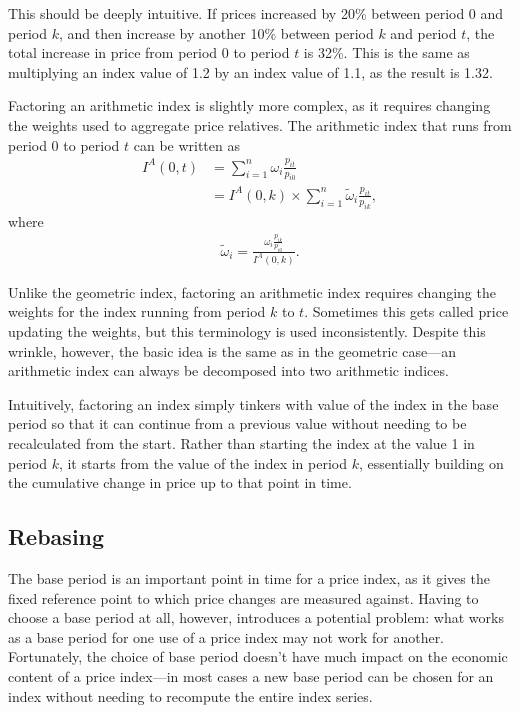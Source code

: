 \documentclass[]{article}
\begin{document}
This should be deeply intuitive. If prices increased by 20\% between period 0 and period \(k\), and then increase by another 10\% between period \(k\) and period \(t\), the total increase in price from period 0 to period \(t\) is 32\%. This is the same as multiplying an index value of 1.2 by an index value of 1.1, as the result is 1.32.

Factoring an arithmetic index is slightly more complex, as it requires changing the weights used to aggregate price relatives. The arithmetic index that runs from period 0 to period \(t\) can be written as
\begin{align*}
I^{A}(0, t) &= \sum_{i = 1}^{n} \omega_{i} \frac{p_{it}}{p_{i0}} \\  
&= I^{A}(0, k) \times \sum_{i = 1}^{n} \tilde{\omega}_{i} \frac{p_{it}}{p_{ik}},
\end{align*}
where
\begin{align*}
\tilde{\omega}_{i} = \frac{\omega_{i} \frac{p_{ik}}{p_{i0}}}{I^{A}(0, k)}. 
\end{align*}

Unlike the geometric index, factoring an arithmetic index requires changing the weights for the index running from period \(k\) to \(t\). Sometimes this gets called price updating the weights, but this terminology is used inconsistently. Despite this wrinkle, however, the basic idea is the same as in the geometric case---an arithmetic index can always be decomposed into two arithmetic indices.

Intuitively, factoring an index simply tinkers with value of the index in the base period so that it can continue from a previous value without needing to be recalculated from the start. Rather than starting the index at the value 1 in period \(k\), it starts from the value of the index in period \(k\), essentially building on the cumulative change in price up to that point in time.

\hypertarget{rebasing}{%
\subsection{Rebasing}\label{rebasing}}

The base period is an important point in time for a price index, as it gives the fixed reference point to which price changes are measured against. Having to choose a base period at all, however, introduces a potential problem: what works as a base period for one use of a price index may not work for another. Fortunately, the choice of base period doesn't have much impact on the economic content of a price index---in most cases a new base period can be chosen for an index without needing to recompute the entire index series.
\end{document}
